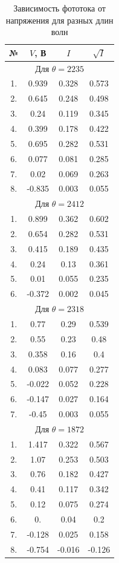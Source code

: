\documentclass[12pt]{kiarticle}
\begin{document}
\begin{table}[h!]
	\caption{Зависимость фототока от напряжения для разных длин волн}
	\begin{center}
		\begin{tabular}{|c|c|c|c|}
			\hline
			№ & $ V $, В & $ I $ & $ \sqrt{I}  $ \\
			\hline
			\multicolumn{4}{|c|}{Для $ \theta = 2235 $} \\
			\hline
			1. & 0.939 & 0.328 & 0.573 \\
			2. & 0.645 & 0.248 & 0.498 \\
			3. & 0.24 & 0.119 & 0.345 \\
			4. & 0.399 & 0.178 & 0.422 \\
			5. & 0.695 & 0.282 & 0.531 \\
			6. & 0.077 & 0.081 & 0.285 \\
			7. & 0.02 & 0.069 & 0.263 \\
			8. & -0.835 & 0.003 & 0.055 \\
			\hline 
			\multicolumn{4}{|c|}{Для $ \theta = 2412 $} \\
			\hline
			1. & 0.899 & 0.362 & 0.602 \\
			2. & 0.654 & 0.282 & 0.531 \\
			3. & 0.415 & 0.189 & 0.435 \\
			4. & 0.24 & 0.13 & 0.361 \\
			5. & 0.01 & 0.055 & 0.235 \\
			6. & -0.372 & 0.002 & 0.045 \\
			\hline 
			\multicolumn{4}{|c|}{Для $ \theta = 2318 $} \\
			\hline
			1. & 0.77 & 0.29 & 0.539 \\
			2. & 0.55 & 0.23 & 0.48 \\
			3. & 0.358 & 0.16 & 0.4 \\
			4. & 0.083 & 0.077 & 0.277 \\
			5. & -0.022 & 0.052 & 0.228 \\
			6. & -0.147 & 0.027 & 0.164 \\
			7. & -0.45 & 0.003 & 0.055 \\
			\hline 
			\multicolumn{4}{|c|}{Для $ \theta = 1872 $} \\
			\hline
			1. & 1.417 & 0.322 & 0.567 \\
			2. & 1.07 & 0.253 & 0.503 \\
			3. & 0.76 & 0.182 & 0.427 \\
			4. & 0.41 & 0.117 & 0.342 \\
			5. & 0.12 & 0.075 & 0.274 \\
			6. & 0. & 0.04 & 0.2 \\
			7. & -0.128 & 0.025 & 0.158 \\
			8. & -0.754 & -0.016 & -0.126 \\
			\hline
		\end{tabular} 
	\end{center}
	\label{}
\end{table}
\end{document}
